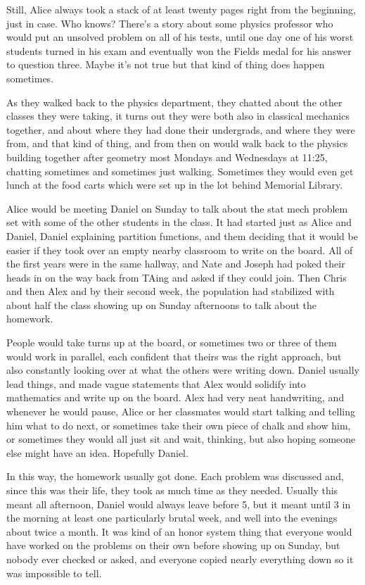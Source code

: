 Still, Alice always took a stack of at least twenty pages right from the beginning, just in case. Who knows? There's a story about some physics professor who would put an unsolved problem on all of his tests, until one day one of his worst students turned in his exam and eventually won the Fields medal for his answer to question three. Maybe it's not true but that kind of thing does happen sometimes. 

As they walked back to the physics department, they chatted about the other classes they were taking, it turns out they were both also in classical mechanics together, and about where they had done their undergrads, and where they were from, and that kind of thing, and from then on would walk back to the physics building together after geometry most Mondays and Wednesdays at 11:25, chatting sometimes and sometimes just walking. Sometimes they would even get lunch at the food carts which were set up in the lot behind Memorial Library. 

\mypause

Alice would be meeting Daniel on Sunday to talk about the stat mech problem set with some of the other students in the class. It had started just as Alice and Daniel, Daniel explaining partition functions, and them deciding that it would be easier if they took over an empty nearby classroom to write on the board. All of the first years were in the same hallway, and Nate and Joseph had poked their heads in on the way back from TAing and asked if they could join. Then Chris and then Alex and by their second week, the population had stabilized with about half the class showing up on Sunday afternoons to talk about the homework.

People would take turns up at the board, or sometimes two or three of them would work in parallel, each confident that theirs was the right approach, but also constantly looking over at what the others were writing down. Daniel usually lead things, and made vague statements that Alex would solidify into mathematics and write up on the board. Alex had very neat handwriting, and whenever he would pause, Alice or her classmates would start talking and telling him what to do next, or sometimes take their own piece of chalk and show him, or sometimes they would all just sit and wait, thinking, but also hoping someone else might have an idea. Hopefully Daniel.

In this way, the homework usually got done. Each problem was discussed and, since this was their life, they took as much time as they needed. Usually this meant all afternoon, Daniel would always leave before 5, but it meant until 3 in the morning at least one particularly brutal week, and well into the evenings about twice a month. It was kind of an honor system thing that everyone would have worked on the problems on their own before showing up on Sunday, but nobody ever checked or asked, and everyone copied nearly everything down so it was impossible to tell.

